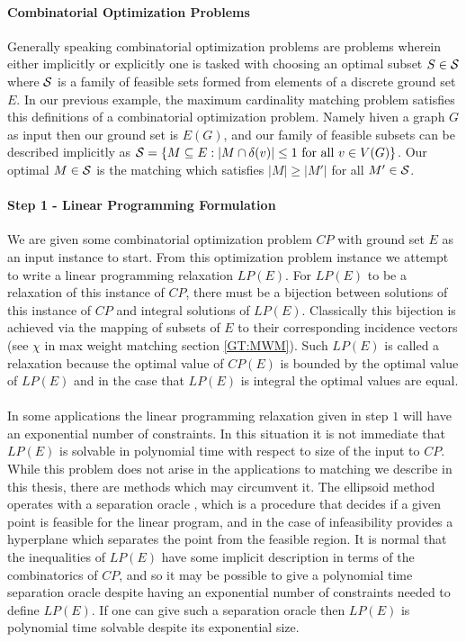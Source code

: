 \paragraph{Combinatorial Optimization Problems}
Generally speaking combinatorial optimization problems are problems wherein either implicitly or explicitly one is tasked with choosing an optimal subset $S \in \mathcal{S}$ where $\mathcal{S}$ is a family of feasible sets formed from elements of a discrete ground set $E$. In our previous example, the maximum cardinality matching problem satisfies this definitions of a combinatorial optimization problem. Namely hiven a graph $G$ as input then our ground set is $E(G)$, and our family of feasible subsets can be described implicitly as $\mathcal{S} = \{M \subseteq E: |M \cap \delta(v)| \leq 1 \text{ for all } v\in V(G)\}$. Our optimal $M \in \mathcal{S}$ is the matching which satisfies $|M| \geq |M'|$ for all $M' \in \mathcal{S}$.
\paragraph{Step 1 - Linear Programming Formulation}
We are given some combinatorial optimization  problem $CP$ with ground set $E$ as an input instance to start. From this optimization problem instance we attempt to write a linear programming relaxation $LP(E)$. For $LP(E)$ to be a relaxation of this instance of $CP$, there must be a bijection between solutions of this instance of $CP$ and integral solutions of $LP(E)$. Classically this bijection is achieved via the mapping of subsets of $E$ to their corresponding incidence vectors (see $\chi$ in max weight matching section \ref{GT:MWM}). Such $LP(E)$ is called a relaxation because the optimal value of $CP(E)$ is bounded by the optimal value of $LP(E)$ and in the case that $LP(E)$ is integral the optimal values are equal.
\paragraph{}
In some applications the linear programming relaxation given in step $1$ will have an exponential number of constraints. In this situation it is not immediate that $LP(E)$ is solvable in polynomial time with respect to size of the input to $CP$. While this problem does not arise in the applications to matching we describe in this thesis, there are methods which may circumvent it. The ellipsoid method operates with a separation oracle \cite{grotschel1981ellipsoid}, which is a procedure that decides if a given point is feasible for the linear program, and in the case of infeasibility provides a hyperplane which separates the point from the feasible region. It is normal that the inequalities of $LP(E)$ have some implicit description in terms of the combinatorics of $CP$, and so it may be possible to give a polynomial time separation oracle despite having an exponential number of constraints needed to define $LP(E)$. If one can give such a separation oracle then $LP(E)$ is polynomial time solvable despite its exponential size.
